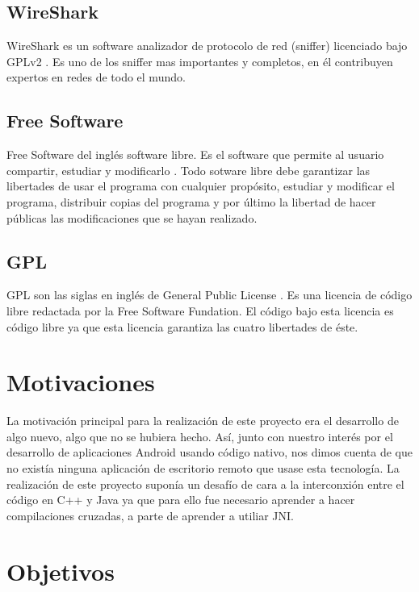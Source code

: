 \subsection{WireShark}

WireShark es un software analizador de protocolo de red (sniffer) licenciado bajo GPLv2 \cite{wiresharkpage:wireshark}. Es uno de los sniffer mas importantes y completos, en él contribuyen expertos en redes de todo el mundo.

\subsection{Free Software}

Free Software del inglés software libre. Es el software que permite al usuario compartir, estudiar y modificarlo \cite{FSpage:FS}. Todo sotware libre debe garantizar las libertades de usar el programa con cualquier propósito, estudiar y modificar el programa, distribuir copias del programa y por último la libertad de hacer públicas las modificaciones que se hayan realizado.

\subsection{GPL}

GPL son las siglas en inglés de General Public License \cite{GPLpage:GPL}. Es una licencia de código libre redactada por la Free Software Fundation. El código bajo esta licencia es código libre ya que esta licencia garantiza las cuatro libertades de éste.
\newpage
\section{Motivaciones}

La motivación principal para la realización de este proyecto era el desarrollo de algo nuevo, algo que no se hubiera hecho. Así, junto con nuestro interés por el desarrollo de aplicaciones Android usando código nativo, nos dimos cuenta de que no existía ninguna aplicación de escritorio remoto que usase esta tecnología. La realización de este proyecto suponía un desafío de cara a la interconxión entre el código en C++ y Java ya que para ello fue necesario aprender a hacer compilaciones cruzadas, a parte de aprender a utiliar JNI.

\section{Objetivos}

